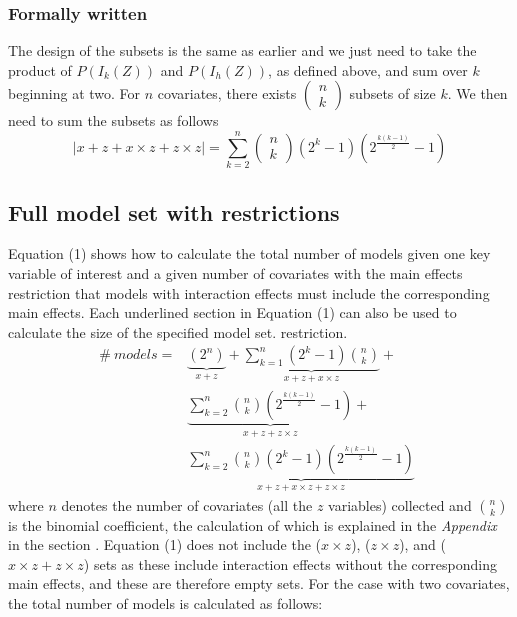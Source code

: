 \subsubsection{Formally written}
The design of the subsets is the same as earlier and we just need to take the product of
$P\left(I_k\left(Z\right)\right)$ and $P\left(I_h\left(Z\right)\right)$, as defined above, and sum over $k$ beginning at two.
For $n$ covariates, there exists $\left( \begin{array}{c}
n \\ 
k \end{array}
\right)$ subsets of size $k$. We then need to sum the subsets as follows
\[|x + z + x \times z+z \times z|=\sum^n_{k=2}{\left( \begin{array}{c}
n \\ 
k \end{array}
\right)\left(2^k-1\right)\left(2^{\frac{k\left(k-1\right)}{2}}-1\right)}\] 


\subsection{Full model set with restrictions}
Equation (1) shows how to calculate the total number of models given one key variable of interest and a given number of covariates with the main effects restriction that models with interaction effects must include the corresponding main effects. Each underlined section in Equation (1) can also be used to calculate the size of the specified model set.
 restriction. \\
\begin{equation} 
\begin{aligned}
\#\ models={} & \underbrace{\left(2^n\right)}_{x + z}+\underbrace{\sum^n_{k=1}{\left(2^k-1\right)\binom{n}{k}}}_{x + z + x \times z} + \\ 
& \underbrace{\sum^n_{k=2}{\binom{n}{k}\left(2^{\frac{k\left(k-1\right)}{2}}-1\right)}}_{x + z + z \times z} + \\
& \underbrace{\sum^n_{k=2}{\binom{n}{k}\left(2^k-1\right)\left(2^{\frac{k\left(k-1\right)}{2}}-1\right)}}_{x + z + x \times z + z \times z}\ \  
\end{aligned}
\end{equation}  
where $n$ denotes the number of covariates (all the $z$ variables) collected and $\binom{n}{k}$ is the binomial coefficient, the calculation of which is explained in the \textit{Appendix} in the section .
Equation (1) does not include the ($x \times z$), ($z \times z$), and ($x \times z + z \times z$) sets as these include interaction effects without the corresponding main effects, and these are therefore empty sets. For the case with two covariates, the total number of models is calculated as follows:

